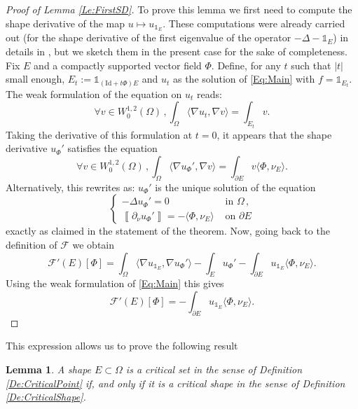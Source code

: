 \documentclass{article}
\newtheorem{lemma}[material]{Lemma}
\def\O{{\Omega}}
\def\n{{\nabla}}
\numberwithin{equation}{section}
\begin{document}
\begin{proof}[Proof of Lemma \ref{Le:FirstSD}]
To prove this lemma we first need to compute the shape derivative of the map $u\mapsto u_{\mathds 1_E}$. These computations were already carried out (for the shape derivative of the first eigenvalue of the operator $-\Delta-\mathds 1_E$) in details in \cite{MRB2020}, but we sketch them in the present case for the sake of completeness. Fix $E$ and a compactly supported vector field $\Phi$. Define, for any $t$ such that $|t|$ small enough, $E_t:=\mathds 1_{(\mathrm{Id}+t\Phi)E}$ and $u_t$ as the solution of \eqref{Eq:Main} with $f=\mathds 1_{E_t}$. The weak formulation of the equation on $u_t$ reads:
\begin{equation}\forall v\in W^{1,2}_0(\O)\,, \int_\O \langle \n u_t,\n v\rangle=\int_{E_t}v.\end{equation}
Taking the derivative of this formulation at $t=0$, it appears that the shape derivative $u_\Phi'$ satisfies the equation
\begin{equation}\label{Eq:WeakFSD}
\forall v \in W^{1,2}_0(\O)\,, \int_\O \langle \n u_\Phi',\n v\rangle=\int_{\partial E} v\langle \Phi,\nu_E\rangle.
\end{equation}
Alternatively, this rewrites as: $u_\Phi'$  is the unique solution of the equation 
\[\begin{cases}
-\Delta u_\Phi'=0&\text{ in }\O\,, 
\\ \left\llbracket \partial_\nu u_\Phi' \right\rrbracket=-\langle \Phi,\nu_E\rangle&\text{ on }\partial E
\end{cases}
\] exactly as claimed in the statement of the theorem. Now, going back to the definition of $\mathscr F$ we obtain 
\[ \mathscr F'(E)[\Phi]=\int_\O \langle \n u_{\mathds 1_E},\n u_\Phi'\rangle-\int_E u_\Phi'-\int_{\partial E}u_{\mathds 1_E}\langle \Phi,\nu_E\rangle.\]Using the weak formulation of \eqref{Eq:Main} this gives
\[ \mathscr F'(E)[\Phi]=-\int_{\partial E}u_{\mathds 1_E}\langle \Phi,\nu_E\rangle.\]
\end{proof}
This expression allows us to prove the following result
\begin{lemma}\label{Le:EquivalenceCritical}
A shape $E\subset \O$ is a critical set in the sense of Definition \ref{De:CriticalPoint} if, and only if it is a critical shape in the sense of Definition \ref{De:CriticalShape}.
\end{lemma}
\end{document}
